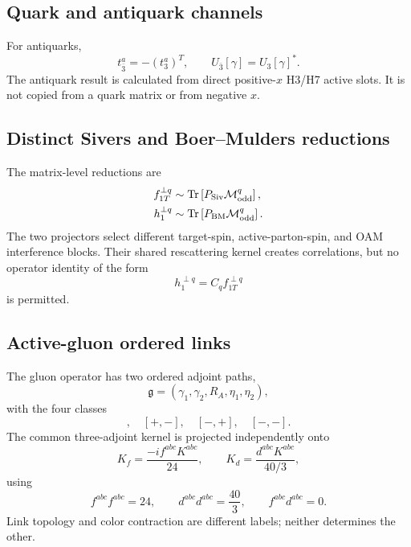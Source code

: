 \documentclass[11pt]{article}
\newcommand{\Tr}{\operatorname{Tr}}
\newcommand{\cM}{\mathcal M}
\begin{document}
\subsection{Quark and antiquark channels}

For antiquarks,
\begin{equation}
 t_{\bar3}^a=-(t_3^a)^T,
 \qquad
 U_{\bar3}[\gamma]=U_3[\gamma]^*.
 \label{eq:antifundamental}
\end{equation}
The antiquark result is calculated from direct positive-\(x\) H3/H7 active
slots.  It is not copied from a quark matrix or from negative \(x\).

\subsection{Distinct Sivers and Boer--Mulders reductions}

The matrix-level reductions are
\begin{align}
 f_{1T}^{\perp q}
 &\sim
 \Tr\left[P_{\rm Siv}\cM_{\rm odd}^{q}\right],
 \label{eq:sivers-proj}\\
 h_1^{\perp q}
 &\sim
 \Tr\left[P_{\rm BM}\cM_{\rm odd}^{q}\right].
 \label{eq:bm-proj}
\end{align}
The two projectors select different target-spin, active-parton-spin, and OAM
interference blocks.  Their shared rescattering kernel creates correlations,
but no operator identity of the form
\begin{equation}
 h_1^{\perp q}=C_q f_{1T}^{\perp q}
 \label{eq:no-proportionality}
\end{equation}
is permitted.

\subsection{Active-gluon ordered links}

The gluon operator has two ordered adjoint paths,
\begin{equation}
 \mathfrak g=(\gamma_1,\gamma_2,R_A,\eta_1,\eta_2),
 \label{eq:gluon-link-pair}
\end{equation}
with the four classes
\begin{equation}
 [+,+],\quad[+,-],\quad[-,+],\quad[-,-].
 \label{eq:four-link-pairs}
\end{equation}
The common three-adjoint kernel is projected independently onto
\begin{equation}
 K_f=\frac{-if^{abc}K^{abc}}{24},
 \qquad
 K_d=\frac{d^{abc}K^{abc}}{40/3},
 \label{eq:fd-projectors}
\end{equation}
using
\begin{equation}
 f^{abc}f^{abc}=24,
 \qquad
 d^{abc}d^{abc}=\frac{40}{3},
 \qquad
 f^{abc}d^{abc}=0.
 \label{eq:fd-norms}
\end{equation}
Link topology and color contraction are different labels; neither determines
the other.
\end{document}
